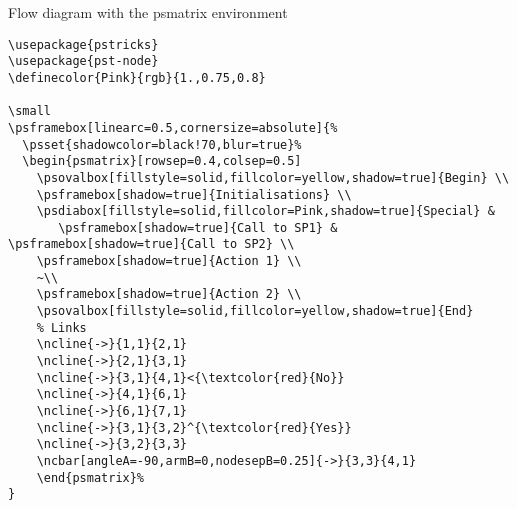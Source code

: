 \documentclass{article}
\begin{document}
Flow diagram with the psmatrix environment

\vspace{0.5cm}
\small
{}

\bigskip
\begin{verbatim}
\usepackage{pstricks}
\usepackage{pst-node}
\definecolor{Pink}{rgb}{1.,0.75,0.8}

\small
\psframebox[linearc=0.5,cornersize=absolute]{%
  \psset{shadowcolor=black!70,blur=true}%
  \begin{psmatrix}[rowsep=0.4,colsep=0.5]
    \psovalbox[fillstyle=solid,fillcolor=yellow,shadow=true]{Begin} \\
    \psframebox[shadow=true]{Initialisations} \\
    \psdiabox[fillstyle=solid,fillcolor=Pink,shadow=true]{Special} &
       \psframebox[shadow=true]{Call to SP1} & \psframebox[shadow=true]{Call to SP2} \\
    \psframebox[shadow=true]{Action 1} \\
    ~\\
    \psframebox[shadow=true]{Action 2} \\
    \psovalbox[fillstyle=solid,fillcolor=yellow,shadow=true]{End}
    % Links
    \ncline{->}{1,1}{2,1}
    \ncline{->}{2,1}{3,1}
    \ncline{->}{3,1}{4,1}<{\textcolor{red}{No}}
    \ncline{->}{4,1}{6,1}
    \ncline{->}{6,1}{7,1}
    \ncline{->}{3,1}{3,2}^{\textcolor{red}{Yes}}
    \ncline{->}{3,2}{3,3}
    \ncbar[angleA=-90,armB=0,nodesepB=0.25]{->}{3,3}{4,1}
    \end{psmatrix}%
}
\end{verbatim}
\end{document}
